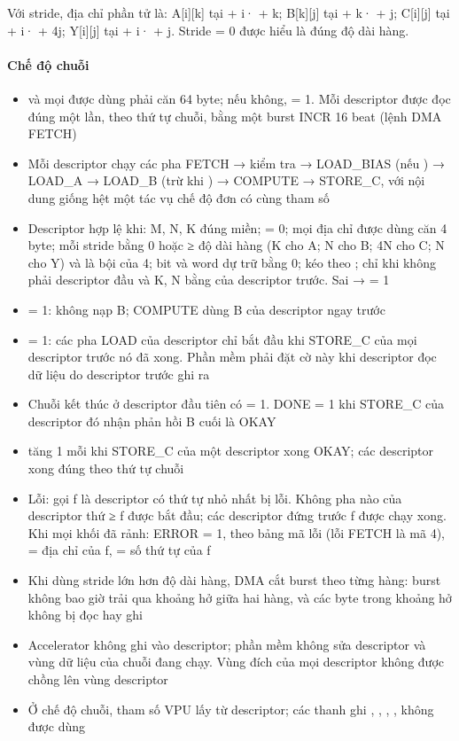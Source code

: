 Với stride, địa chỉ phần tử là: A[i][k] tại  + i· + k; B[k][j] tại  + k· + j; C[i][j] tại  + i· + 4j; Y[i][j] tại  + i· + j. Stride = 0 được hiểu là đúng độ dài hàng.


\paragraph{Chế độ chuỗi}\label{tab:7-3}
\begin{itemize}
\item {} và mọi  được dùng phải căn 64 byte; nếu không,  = 1. Mỗi descriptor được đọc đúng một lần, theo thứ tự chuỗi, bằng một burst INCR 16 beat (lệnh DMA FETCH)
\item Mỗi descriptor chạy các pha FETCH → kiểm tra → LOAD\_BIAS (nếu ) → LOAD\_A → LOAD\_B (trừ khi ) → COMPUTE → STORE\_C, với nội dung giống hệt một tác vụ chế độ đơn có cùng tham số
\item Descriptor hợp lệ khi: M, N, K đúng miền;  = 0; mọi địa chỉ được dùng căn 4 byte; mỗi stride bằng 0 hoặc ≥ độ dài hàng (K cho A; N cho B; 4N cho C; N cho Y) và là bội của 4; bit và word dự trữ bằng 0;  kéo theo ;  chỉ khi không phải descriptor đầu và K, N bằng của descriptor trước. Sai →  = 1
\item {} = 1: không nạp B; COMPUTE dùng B của descriptor ngay trước
\item {} = 1: các pha LOAD của descriptor chỉ bắt đầu khi STORE\_C của mọi descriptor trước nó đã xong. Phần mềm phải đặt cờ này khi descriptor đọc dữ liệu do descriptor trước ghi ra
\item Chuỗi kết thúc ở descriptor đầu tiên có  = 1. DONE = 1 khi STORE\_C của descriptor đó nhận phản hồi B cuối là OKAY
\item {} tăng 1 mỗi khi STORE\_C của một descriptor xong OKAY; các descriptor xong đúng theo thứ tự chuỗi
\item Lỗi: gọi f là descriptor có thứ tự nhỏ nhất bị lỗi. Không pha nào của descriptor thứ ≥ f được bắt đầu; các descriptor đứng trước f được chạy xong. Khi mọi khối đã rảnh: ERROR = 1,  theo bảng mã lỗi (lỗi FETCH là mã 4),  = địa chỉ của f,  = số thứ tự của f
\item Khi dùng stride lớn hơn độ dài hàng, DMA cắt burst theo từng hàng: burst không bao giờ trải qua khoảng hở giữa hai hàng, và các byte trong khoảng hở không bị đọc hay ghi
\item Accelerator không ghi vào descriptor; phần mềm không sửa descriptor và vùng dữ liệu của chuỗi đang chạy. Vùng đích của mọi descriptor không được chồng lên vùng descriptor
\item Ở chế độ chuỗi, tham số VPU lấy từ descriptor; các thanh ghi , , , ,  không được dùng
\end{itemize}


